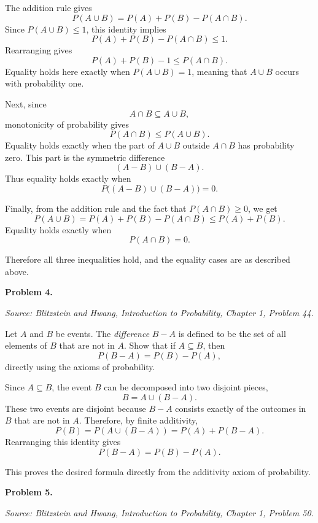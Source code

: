 \documentclass[11pt]{article}
\newcommand{\source}[1]{%
    \vspace{0.15cm}
    {\small\textit{Source: Blitzstein and Hwang, \textit{Introduction to Probability}, Chapter 1, Problem #1.}}
}
\begin{document}
\begin{solutionbox}
The addition rule gives
\[
P(A\cup B)=P(A)+P(B)-P(A\cap B).
\]
Since \(P(A\cup B)\le 1\), this identity implies
\[
P(A)+P(B)-P(A\cap B)\le 1.
\]
Rearranging gives
\[
P(A)+P(B)-1\le P(A\cap B).
\]
Equality holds here exactly when \(P(A\cup B)=1\), meaning that \(A\cup B\) occurs with probability one.

Next, since
\[
A\cap B\subseteq A\cup B,
\]
monotonicity of probability gives
\[
P(A\cap B)\le P(A\cup B).
\]
Equality holds exactly when the part of \(A\cup B\) outside \(A\cap B\) has probability zero. This part is the symmetric difference
\[
(A-B)\cup(B-A).
\]
Thus equality holds exactly when
\[
P\big((A-B)\cup(B-A)\big)=0.
\]

Finally, from the addition rule and the fact that \(P(A\cap B)\ge 0\), we get
\[
P(A\cup B)
=
P(A)+P(B)-P(A\cap B)
\le
P(A)+P(B).
\]
Equality holds exactly when
\[
P(A\cap B)=0.
\]

Therefore all three inequalities hold, and the equality cases are as described above.


\end{solutionbox}
\newpage


\begin{problemheader}
\textbf{Problem 4.}
\end{problemheader}
\source{44}

Let $A$ and $B$ be events. The \emph{difference} $B-A$ is defined to be the set of all elements of $B$ that are not in $A$. Show that if $A\subseteq B$, then
\[
P(B-A)=P(B)-P(A),
\]
directly using the axioms of probability.

\begin{solutionbox}
Since \(A\subseteq B\), the event \(B\) can be decomposed into two disjoint pieces,
\[
B=A\cup(B-A).
\]
These two events are disjoint because \(B-A\) consists exactly of the outcomes in \(B\) that are not in \(A\). Therefore, by finite additivity,
\[
P(B)
=
P(A\cup(B-A))
=
P(A)+P(B-A).
\]
Rearranging this identity gives
\[
P(B-A)=P(B)-P(A).
\]

This proves the desired formula directly from the additivity axiom of probability.


\end{solutionbox}
\newpage


\begin{problemheader}
\textbf{Problem 5.}
\end{problemheader}
\source{50}
\end{document}
